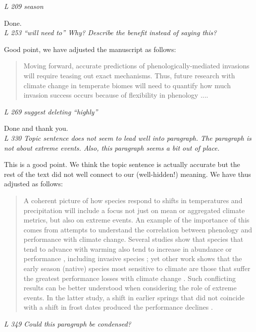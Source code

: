 \documentclass[11pt,a4paper]{letter}
\begin{document}
\begin{letter}{}
\emph{L 209 season} 

Done.\\

\emph{L 253 ``will need to'' Why? Describe the benefit instead of saying this?}

Good point, we have adjusted the manuscript as follows:
\begin{quote}
Moving forward, accurate predictions of phenologically-mediated invasions will require teasing out exact mechanisms. Thus, future research with climate change in temperate biomes will need to quantify how much invasion success occurs because of flexibility in phenology ....
\end{quote}

\emph{L 269 suggest deleting ``highly''}

Done and thank you.\\

\emph{L 330 Topic sentence does not seem to lead well into paragraph. The paragraph is not about extreme events. Also, this paragraph seems a bit out of place.}

This is a good point. We think the topic sentence is actually accurate but the rest of the text did not well connect to our (well-hidden!) meaning. We have thus adjusted as follows:

\begin{quote}
A coherent picture of how species respond to shifts in temperatures and precipitation will include a focus not just on mean or aggregated climate metrics, but also on extreme events. An example of the importance of this comes from attempts to understand the correlation between phenology and performance with climate change. Several studies show that species that tend to advance with warming also tend to increase in abundance or performance \citep{Cleland:2012vn}, including invasive species \citep{Willis:2010al,chuine2013}; yet other work shows that the early season (native) species most sensitive to climate are those that suffer the greatest performance losses with climate change \citep{Inouye:2008gj}. Such conflicting results can be better understood when considering the role of extreme events. In the latter study, a shift in earlier springs that did not coincide with a shift in frost dates produced the performance declines \citep{Inouye:2008gj}. 
\end{quote}

\emph{L 349 Could this paragraph be condensed?}


\end{letter}
\end{document}
